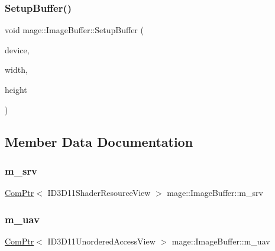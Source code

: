 \subsubsection{\texorpdfstring{Setup\+Buffer()}{SetupBuffer()}}
{\footnotesize\ttfamily void mage\+::\+Image\+Buffer\+::\+Setup\+Buffer (\begin{DoxyParamCaption}\item[{I\+D3\+D11\+Device2 $\ast$}]{device,  }\item[{\hyperlink{namespacemage_a41c104c036fba3756a74e19f793eeaa1}{U32}}]{width,  }\item[{\hyperlink{namespacemage_a41c104c036fba3756a74e19f793eeaa1}{U32}}]{height }\end{DoxyParamCaption})\hspace{0.3cm}{\ttfamily [private]}}



\subsection{Member Data Documentation}
\hypertarget{structmage_1_1_image_buffer_a3909901d1e896e85664b68b59c7c166c}{}\label{structmage_1_1_image_buffer_a3909901d1e896e85664b68b59c7c166c} 
\subsubsection{\texorpdfstring{m\+\_\+srv}{m\_srv}}
{\footnotesize\ttfamily \hyperlink{namespacemage_ae74f374780900893caa5555d1031fd79}{Com\+Ptr}$<$ I\+D3\+D11\+Shader\+Resource\+View $>$ mage\+::\+Image\+Buffer\+::m\+\_\+srv\hspace{0.3cm}{\ttfamily [private]}}

\hypertarget{structmage_1_1_image_buffer_abd30a4842e00bb7729b3c92029e34ee0}{}\label{structmage_1_1_image_buffer_abd30a4842e00bb7729b3c92029e34ee0} 
\subsubsection{\texorpdfstring{m\+\_\+uav}{m\_uav}}
{\footnotesize\ttfamily \hyperlink{namespacemage_ae74f374780900893caa5555d1031fd79}{Com\+Ptr}$<$ I\+D3\+D11\+Unordered\+Access\+View $>$ mage\+::\+Image\+Buffer\+::m\+\_\+uav\hspace{0.3cm}{\ttfamily [private]}}


